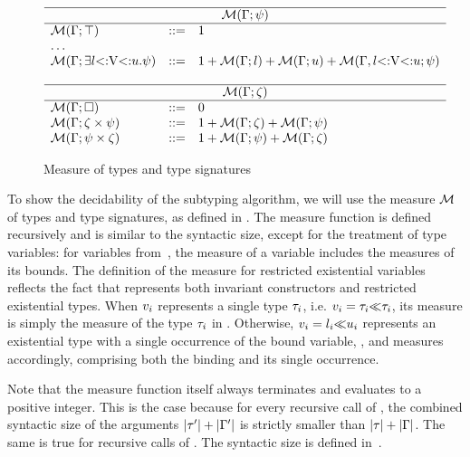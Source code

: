 \begin{figure}
\[\begin{array}{lcl}
    \\
    \hline
    \multicolumn{3}{c}{\tymsrdflt{\tysig}} \\ 
    \hline 
    \tymsrdflt{\tyany} &::=& 1\\
    \multicolumn{3}{l}{\ldots} \\
    \tymsrdflt{\tyexist{\vany}{\tylb}{\tyub}{\tysig}} &::=& 
        1 + \tymsrdflt{\tylb} + \tymsrdflt{\tyub} + 
        \tymsr{\AEnv,\varbound{\vany}{\tylb}{\tyub}}{\tysig}\\
    \\
    \hline
    \multicolumn{3}{c}{\tymsrdflt{\dctxsig}} \\ 
    \hline 
    \tymsrdflt{\square} &::=& 0\\
    \tymsrdflt{\typair{\dctxsig}{\tysig}} &::=& 
        1 + \tymsrdflt{\dctxsig} + \tymsrdflt{\tysig}\\
    \tymsrdflt{\typair{\tysig}{\dctxsig}} &::=& 
        1 + \tymsrdflt{\tysig} + \tymsrdflt{\dctxsig}\\
\end{array}
\]
\caption{Measure of types and type signatures}\label{fig:ty-measure}
\end{figure}

To show the decidability of the subtyping algorithm,
we will use the measure $\operatorname{\mathcal{M}}$ of types and type signatures,
as defined in .
The measure function is defined recursively and is
similar to the syntactic size,
except for the treatment of type variables: for variables from~\AEnv,
the measure of a variable includes the measures of its bounds.
The definition of the measure for restricted existential variables \rexvar
reflects the fact that \tyinv{} represents both
invariant constructors and restricted existential types.
When $v_i$ represents a single type $\tau_i$,
i.e. $v_i = \tau_i{\operatorname{\ll}}\tau_i$,
its measure is simply the measure of the type $\tau_i$ in
\tyinv{}.
Otherwise, $v_i = l_i{\operatorname{\ll}}u_i$ represents
an existential type with a single occurrence of the bound variable,
,
and measures accordingly, comprising both the binding and its single occurrence.

Note that the measure function itself always terminates and evaluates to a
positive integer. This is the case because for every recursive call
 of \tymsrdflt{\ty}, 
the combined syntactic size of the arguments $|\tau'| + |\Gamma'|$
is strictly smaller than $|\tau| + |\Gamma|$.
The same is true for recursive calls
 of \tymsrdflt{\tysig}.
The syntactic size is defined in~.

